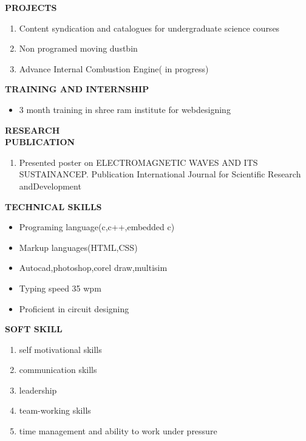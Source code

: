 \documentclass{article}
\begin{document}
\begin{flushleft}
	\vspace{0.30in}
	\textbf{PROJECTS}
	\begin{enumerate}
		\item Content syndication and catalogues for undergraduate science courses\\
		\item Non programed moving dustbin\\
		\item Advance Internal Combustion Engine( in progress)\\
		
	\end{enumerate}
\end{flushleft}

\begin{flushleft}
	\vspace{0.1in}
	\textbf{TRAINING AND INTERNSHIP}
	\begin{itemize}
		\item 3 month training in shree ram institute for webdesigning
	\end{itemize}
\end{flushleft}

\begin{flushleft}
	\vspace{.30in}
	\textbf{RESEARCH \\PUBLICATION}
	\begin{enumerate}
		\item Presented poster on ELECTROMAGNETIC WAVES AND ITS SUSTAINANCEP. Publication International Journal for Scientific Research andDevelopment
	\end{enumerate}
\end{flushleft}

\begin{flushleft}
	\vspace{0.2in}
	\textbf{TECHNICAL SKILLS}
	\begin{itemize}
		\item Programing language(c,c++,embedded c)
		\item Markup languages(HTML,CSS)
		\item Autocad,photoshop,corel draw,multisim
		\item Typing speed 35 wpm
		\item Proficient in circuit designing
	\end{itemize}
\end{flushleft}

\begin{flushleft}
	\vspace{0.30in}
	\textbf{SOFT SKILL}
	\begin{enumerate}
		\item self motivational skills
		\item communication skills
		\item leadership 
		\item team-working skills
		\item time management and ability to work under pressure
	\end{enumerate}
\end{flushleft}
\end{document}
